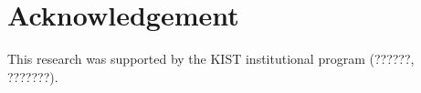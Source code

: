 \documentclass[10pt]{article}
\begin{document}
\section*{Acknowledgement}
This research was supported by the KIST institutional program (??????, ???????).





%
%
%
%
%
%
%
\end{document}
